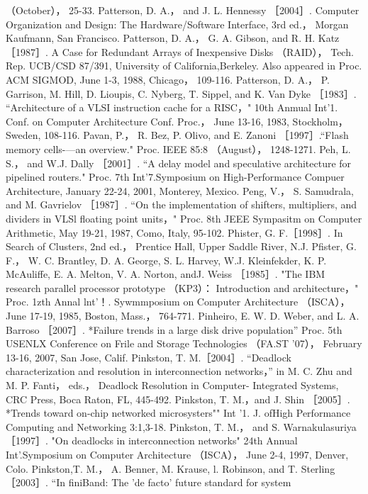 （October）， 25-33.
Patterson, D. A.， and J. L. Hennessy ［2004］. Computer Organization and Design: The Hardware/Software Interface, 3rd ed.，
Morgan Kaufmann, San Francisco.
Patterson, D. A.， G. A. Gibson, and R. H. Katz ［1987］. A Case for Redundant Arrays of Inexpensive Disks （RAID）， Tech. Rep.
UCB/CSD 87/391, University of California,Berkeley. Also appeared in Proc. ACM SIGMOD, June 1-3, 1988, Chicago，
109-116.
Patterson, D. A.， P. Garrison, M. Hill, D. Lioupis, C. Nyberg, T. Sippel, and K. Van Dyke ［1983］. “Architecture of a VLSI
instruction cache for a RISC，" 10th Anmual Int'1. Conf. on Computer Architecture Conf. Proc.， June 13-16, 1983, Stockholm，
Sweden, 108-116.
Pavan, P.， R. Bez, P. Olivo, and E. Zanoni ［1997］.“Flash memory cells-—an overview." Proc. IEEE 85:8 （August）， 1248-1271.
Peh, L. S.， and W.J. Dally ［2001］. “A delay model and speculative architecture for pipelined routers." Proc. 7th Int'7.Symposium
on High-Performance Compuer Architecture, January 22-24, 2001, Monterey, Mexico.
Peng, V.， S. Samudrala, and M. Gavrielov ［1987］. “On the implementation of shifters, multipliers, and dividers in VLSl floating
point units，" Proc. 8th JEEE Sympasitm on Computer Arithmetic, May 19-21, 1987, Como, Italy, 95-102.
Phister, G. F.［1998］. In Search of Clusters, 2nd ed.， Prentice Hall, Upper Saddle River, N.J.
Pfister, G. F.， W. C. Brantley, D. A. George, S. L. Harvey, W.J. Kleinfekder, K. P. McAuliffe, E. A. Melton, V. A. Norton, andJ.
Weiss ［1985］. "The IBM research parallel processor prototype （KP3）： Introduction and architecture，" Proc. 1zth Annal lnt'！.
Sywmmposium on Computer Architecture （ISCA）， June 17-19, 1985, Boston, Mass.， 764-771.
Pinheiro, E. W. D. Weber, and L. A. Barroso ［2007］. *Failure trends in a large disk drive population” Proc. 5th USENLX
Conference on Frile and Storage Technologies （FA.ST '07）， February 13-16, 2007, San Jose, Calif.
Pinkston, T. M.［2004］. “Deadlock characterization and resolution in interconnection networks，” in M. C. Zhu and M. P. Fanti，
eds.， Deadlock Resolution in Computer- Integrated Systems, CRC Press, Boca Raton, FL, 445-492.
Pinkston, T. M.，and J. Shin ［2005］. *Trends toward on-chip networked microsysters"" Int '1. J. ofHigh Performance Computing
and Networking 3:1,3-18.
Pinkston, T. M.， and S. Warnakulasuriya ［1997］. "On deadlocks in interconnection networks" 24th Annual Int'.Symposium on
Computer Architecture （ISCA）， June 2-4, 1997, Denver, Colo.
Pinkston,T. M.， A. Benner, M. Krause, l. Robinson, and T. Sterling ［2003］. “In finiBand: The 'de facto' future standard for system
